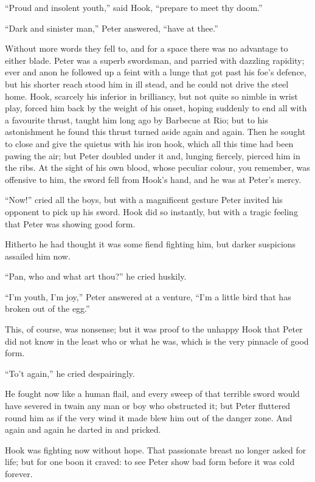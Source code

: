 “Proud and insolent youth,” said Hook, “prepare to meet thy doom.”

“Dark and sinister man,” Peter answered, “have at thee.”

Without more words they fell to, and for a space there was no advantage to either blade.
Peter was a superb swordsman, and parried with dazzling rapidity;
ever and anon he followed up a feint with a lunge that got past his foe’s defence,
but his shorter reach stood him in ill stead, and he could not drive the steel home.
Hook, scarcely his inferior in brilliancy, but not quite so nimble in wrist play,
forced him back by the weight of his onset,
hoping suddenly to end all with a favourite thrust, taught him long ago by Barbecue at Rio;
but to his astonishment he found this thrust turned aside again and again.
Then he sought to close and give the quietus with his iron hook,
which all this time had been pawing the air;
but Peter doubled under it and, lunging fiercely, pierced him in the ribs.
At the sight of his own blood,
whose peculiar colour, you remember, was offensive to him,
the sword fell from Hook’s hand, and he was at Peter’s mercy.

“Now!\@” cried all the boys,
but with a magnificent gesture Peter invited his opponent to pick up his sword.
Hook did so instantly, but with a tragic feeling that Peter was showing good form.

Hitherto he had thought it was some fiend fighting him,
but darker suspicions assailed him now.

“Pan, who and what art thou?\@” he cried huskily.

“I’m youth, I’m joy,” Peter answered at a venture,
“I’m a little bird that has broken out of the egg.”

This, of course, was nonsense;
but it was proof to the unhappy Hook that Peter did not know in the least who or what he was,
which is the very pinnacle of good form.

“To’t again,” he cried despairingly.

He fought now like a human flail,
and every sweep of that terrible sword would have severed in twain any man or boy who obstructed it;
but Peter fluttered round him as if the very wind it made blew him out of the danger zone.
And again and again he darted in and pricked.

Hook was fighting now without hope.
That passionate breast no longer asked for life;
but for one boon it craved:
to see Peter show bad form before it was cold forever.


